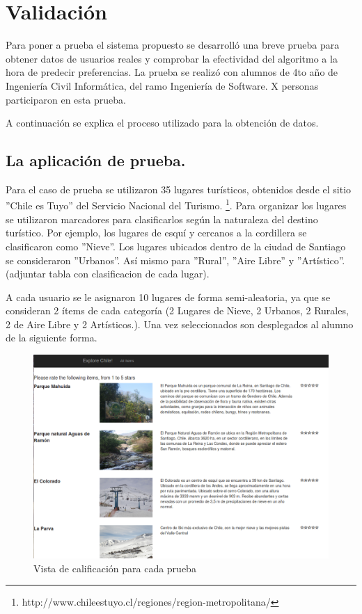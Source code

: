 \chapter{Validación}

Para poner a prueba el sistema propuesto se desarrolló una breve prueba para obtener datos de usuarios reales y comprobar la efectividad del algoritmo a la hora de predecir preferencias. La prueba se realizó con alumnos de 4to año de Ingeniería Civil Informática, del ramo Ingeniería de Software. X personas participaron en esta prueba.

A continuación se explica el proceso utilizado para la obtención de datos.

\section{La aplicación de prueba.}

Para el caso de prueba se utilizaron 35 lugares turísticos, obtenidos desde el sitio ''Chile es Tuyo''  del Servicio Nacional del Turismo. \footnote{http://www.chileestuyo.cl/regiones/region-metropolitana/}. Para organizar los lugares se utilizaron marcadores para clasificarlos según la naturaleza del destino turístico. Por ejemplo, los lugares de esquí y cercanos a la cordillera se clasificaron como ''Nieve''. Los lugares ubicados dentro de la ciudad de Santiago se consideraron ''Urbanos''. Así mismo para ''Rural'', ''Aire Libre'' y ''Artístico''. (adjuntar tabla con clasificacion de cada lugar).

A cada usuario se le asignaron 10 lugares de forma semi-aleatoria, ya que se consideran 2 ítems de cada categoría (2 Lugares de Nieve, 2 Urbanos, 2 Rurales, 2 de Aire Libre y 2 Artísticos.). Una vez seleccionados son desplegados al alumno de la siguiente forma.

\begin{figure}[hbtp]
\centering
\includegraphics[scale=0.65]{images/rate.png}
\caption{Vista de calificación para cada prueba}
\end{figure} 

